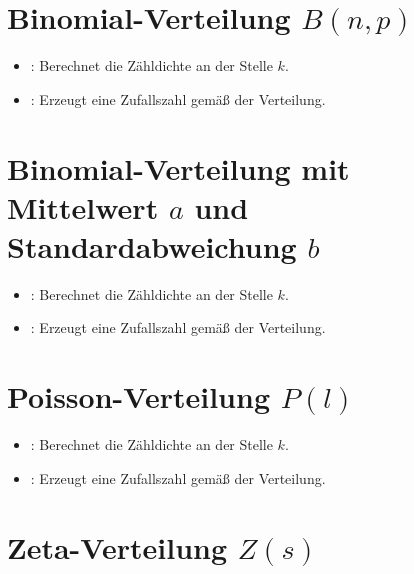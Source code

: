 \section{Binomial-Verteilung \texorpdfstring{$B(n,p)$}{B(n,p)}}

\begin{itemize}

\item
{}:
Berechnet die Zähldichte an der Stelle $k$.


\item
{}:
Erzeugt eine Zufallszahl gemäß der Verteilung.

\end{itemize}



\section{Binomial-Verteilung mit Mittelwert \texorpdfstring{$a$}{a} und Standardabweichung \texorpdfstring{$b$}{b}}

\begin{itemize}

\item
{}:
Berechnet die Zähldichte an der Stelle $k$.


\item
{}:
Erzeugt eine Zufallszahl gemäß der Verteilung.

\end{itemize}



\section{Poisson-Verteilung \texorpdfstring{$P(l)$}{P(l)}}

\begin{itemize}

\item
{}:
Berechnet die Zähldichte an der Stelle $k$.

\item
{}:
Erzeugt eine Zufallszahl gemäß der Verteilung.

\end{itemize}



\section{Zeta-Verteilung \texorpdfstring{$Z(s)$}{Z(s)}}

